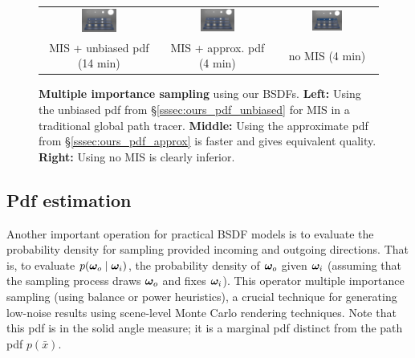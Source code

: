 \begin{figure}[t]
	\addtolength{\tabcolsep}{-4pt}
	\begin{tabular}{ccc}
		\includegraphics[width=0.32\textwidth]{images/validations/mis/mi_acr_64spp_14min.jpg} & 
		\includegraphics[width=0.32\textwidth]{images/validations/mis/mi_trt_64spp_4_1min.jpg} & 
		\includegraphics[width=0.32\textwidth]{images/validations/mis/mi_noMIS_80spp_4_2min.jpg} \\
		MIS + unbiased pdf (14 min) &
		MIS + approx. pdf (4 min) &
		no MIS (4 min) \\ 
	\end{tabular}
	\caption{
		\textbf{Multiple importance sampling} using our BSDFs.
		\textbf{Left:} Using the unbiased pdf from \S\ref{sssec:ours_pdf_unbiased} for MIS in a traditional global path tracer. \textbf{Middle:} Using the approximate pdf from \S\ref{sssec:ours_pdf_approx} is faster and gives equivalent quality. \textbf{Right:} Using no MIS is clearly inferior.}
	\label{fig:pdf-eval}
\end{figure}


\subsection{Pdf estimation}
\label{subsec:ours_pdf}

Another important operation for practical BSDF models is to evaluate the probability density for sampling provided incoming and outgoing directions.
That is, to evaluate $p(\bm{\omega}_o \;|\; \bm{\omega}_i)$, the probability density of $\bm{\omega}_o$ given $\bm{\omega}_i$ (assuming that the sampling process draws $\bm{\omega}_o$ and fixes $\bm{\omega}_i$).
This operator  multiple importance sampling (using balance or power heuristics), a crucial technique for generating low-noise results using scene-level Monte Carlo rendering techniques. Note that this pdf is in the solid angle measure; it is a marginal pdf distinct from the path pdf $p(\bar x)$.

